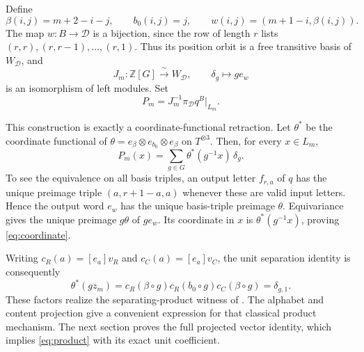 \documentclass[11pt]{article}
\newcommand{\Z}{\mathbb Z}
\newcommand{\coeff}[2]{[#1]#2}
\numberwithin{equation}{section}
\begin{document}
Define
\[
 \beta(i,j)=m+2-i-j,\qquad b_0(i,j)=j,\qquad
 w(i,j)=(m+1-i,\beta(i,j)).
\]
The map $w:B\to\mathcal D$ is a bijection, since the row of length $r$ lists $(r,r),(r,r-1),\ldots,(r,1)$. Thus its position orbit is a free transitive basis of $W_{\mathcal D}$, and
\[
 J_m:\Z[G]\xrightarrow{\ \sim\ }W_{\mathcal D},\qquad \delta_g\longmapsto ge_w
\]
is an isomorphism of left modules. Set
\begin{equation}\label{eq:P}
 P_m=J_m^{-1}\pi_{\mathcal D}q^B\big|_{L_m}.
\end{equation}

This construction is exactly a coordinate-functional retraction. Let $\theta^*$ be the coordinate functional of
$\theta=e_\beta\otimes e_{b_0}\otimes e_\beta$ on $T^{\otimes3}$. Then, for every $x\in L_m$,
\begin{equation}\label{eq:coordinate}
 P_m(x)=\sum_{g\in G}\theta^*(g^{-1}x)\,\delta_g.
\end{equation}
To see the equivalence on all basis triples, an output letter $f_{r,a}$ of $q$ has the unique preimage triple $(a,r+1-a,a)$ whenever these are valid input letters. Hence the output word $e_w$ has the unique basis-triple preimage $\theta$. Equivariance gives the unique preimage $g\theta$ of $ge_w$. Its coordinate in $x$ is $\theta^*(g^{-1}x)$, proving \eqref{eq:coordinate}.

Writing $c_R(a)=\coeff{e_a}{v_R}$ and $c_C(a)=\coeff{e_a}{v_C}$, the unit separation identity is consequently
\begin{equation}\label{eq:product}
 \theta^*(gz_m)=c_R(\beta\circ g)c_R(b_0\circ g)c_C(\beta\circ g)
       =\delta_{g,1}.
\end{equation}
These factors realize the separating-product witness of \cite[Lemma~(iii)]{BK}. The alphabet and content projection give a convenient expression for that classical product mechanism. The next section proves the full projected vector identity, which implies \eqref{eq:product} with its exact unit coefficient.
\end{document}
